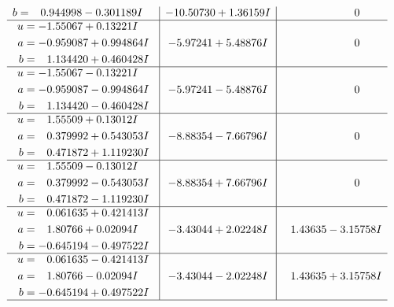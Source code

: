\documentclass[1p]{elsarticle_modified}
\theoremstyle{definition}
\begin{document}
$$\begin{array}{c|c|c}
\begin{aligned}
b &= \phantom{-}0.944998 - 0.301189 I\end{aligned}
 & -10.50730 + 1.36159 I & \phantom{-0.000000 } 0 \\ \hline\begin{aligned}
u &= -1.55067 + 0.13221 I \\
a &= -0.959087 + 0.994864 I \\
b &= \phantom{-}1.134420 + 0.460428 I\end{aligned}
 & -5.97241 + 5.48876 I & \phantom{-0.000000 } 0 \\ \hline\begin{aligned}
u &= -1.55067 - 0.13221 I \\
a &= -0.959087 - 0.994864 I \\
b &= \phantom{-}1.134420 - 0.460428 I\end{aligned}
 & -5.97241 - 5.48876 I & \phantom{-0.000000 } 0 \\ \hline\begin{aligned}
u &= \phantom{-}1.55509 + 0.13012 I \\
a &= \phantom{-}0.379992 + 0.543053 I \\
b &= \phantom{-}0.471872 + 1.119230 I\end{aligned}
 & -8.88354 - 7.66796 I & \phantom{-0.000000 } 0 \\ \hline\begin{aligned}
u &= \phantom{-}1.55509 - 0.13012 I \\
a &= \phantom{-}0.379992 - 0.543053 I \\
b &= \phantom{-}0.471872 - 1.119230 I\end{aligned}
 & -8.88354 + 7.66796 I & \phantom{-0.000000 } 0 \\ \hline\begin{aligned}
u &= \phantom{-}0.061635 + 0.421413 I \\
a &= \phantom{-}1.80766 + 0.02094 I \\
b &= -0.645194 - 0.497522 I\end{aligned}
 & -3.43044 + 2.02248 I & \phantom{-}1.43635 - 3.15758 I \\ \hline\begin{aligned}
u &= \phantom{-}0.061635 - 0.421413 I \\
a &= \phantom{-}1.80766 - 0.02094 I \\
b &= -0.645194 + 0.497522 I\end{aligned}
 & -3.43044 - 2.02248 I & \phantom{-}1.43635 + 3.15758 I\\
 \hline 
 \end{array}$$\newpage$$\begin{array}{c|c|c}  

\end{array}$$
\end{document}
